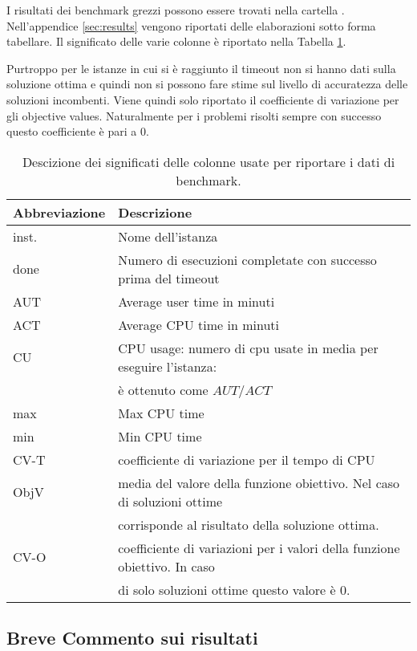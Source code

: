 I risultati dei benchmark grezzi possono essere trovati nella cartella 
. Nell'appendice  \ref{sec:results} vengono riportati delle
elaborazioni sotto forma tabellare.
Il significato delle varie colonne è riportato nella Tabella \ref{table:description}.

Purtroppo per le istanze in cui si è raggiunto il timeout non si hanno dati
sulla soluzione ottima e quindi non si possono 
fare stime sul livello di accuratezza delle soluzioni incombenti.
Viene quindi solo riportato il coefficiente di variazione per gli
objective values. Naturalmente 
per i problemi risolti sempre con successo questo coefficiente è pari a $0$.

\begin{table}
\centering
\small
\begin{tabular}{| l| l |}
\hline
Abbreviazione & Descrizione \\
\hline
inst. & Nome dell'istanza \\
done & Numero di esecuzioni completate con successo prima del timeout\\
AUT & Average user time in minuti \\
ACT & Average CPU time in minuti\\
CU  & CPU usage: numero di cpu usate in media per eseguire l'istanza: \\
	& è ottenuto come $AUT/ACT$\\
max & Max CPU time \\
min & Min CPU time \\
CV-T & coefficiente di variazione per il tempo di CPU \\
ObjV & media del valore della funzione obiettivo. Nel caso di soluzioni ottime \\
	& corrisponde al risultato della soluzione ottima.\\
CV-O & coefficiente di variazioni per i valori della funzione obiettivo. In caso \\
& di solo soluzioni ottime questo valore è $0$. \\
\hline
\end{tabular}
\caption{Descizione dei significati delle colonne usate per riportare i dati
di benchmark.}
\label{table:description}
\end{table}


\subsection{Breve Commento sui risultati}



